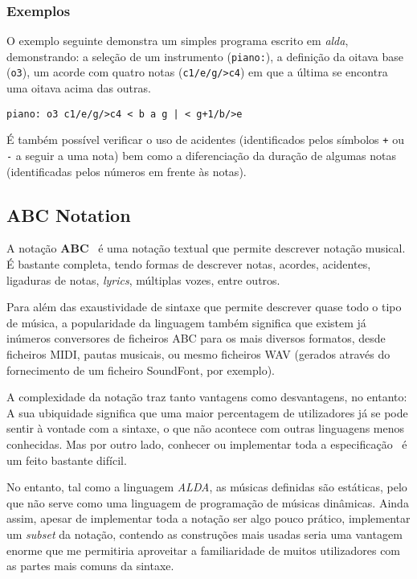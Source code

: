 \subsubsection{Exemplos}
O exemplo seguinte demonstra um simples programa escrito em \textit{alda}, demonstrando: a seleção de um instrumento (\texttt{piano:}), a definição da oitava base (\texttt{o3}), um acorde com quatro notas (\texttt{c1/e/g/>c4}) em que a última se encontra uma oitava acima das outras.
\begin{lstlisting}[caption={Exemplo da linguagem alda}]
piano: o3 c1/e/g/>c4 < b a g | < g+1/b/>e
\end{lstlisting}
 É também possível verificar o uso de acidentes (identificados pelos símbolos \texttt{+} ou \texttt{-} a seguir a uma nota) bem como a diferenciação da duração de algumas notas (identificadas pelos números em frente às notas).
\subsection{ABC Notation}
A notação \textbf{ABC}~\cite{AbcPlus, abc-notation} é uma notação textual que permite descrever notação musical. É bastante completa, tendo formas de descrever notas, acordes, acidentes, ligaduras de notas, \textit{lyrics}, múltiplas vozes, entre outros.

Para além das exaustividade de sintaxe que permite descrever quase todo o tipo de música, a popularidade da linguagem também significa que existem já inúmeros conversores de ficheiros ABC para os mais diversos formatos, desde ficheiros MIDI, pautas musicais, ou mesmo ficheiros WAV (gerados através do fornecimento de um ficheiro SoundFont, por exemplo).

A complexidade da notação traz tanto vantagens como desvantagens, no entanto: A sua ubiquidade significa que uma maior percentagem de utilizadores já se pode sentir à vontade com a sintaxe, o que não acontece com outras linguagens menos conhecidas. Mas por outro lado, conhecer ou implementar toda a especificação~\cite{abc-notation-standard} é um feito bastante difícil.

No entanto, tal como a linguagem \textit{ALDA}, as músicas definidas são estáticas, pelo que não serve como uma linguagem de programação de músicas dinâmicas. Ainda assim, apesar de implementar toda a notação ser algo pouco prático, implementar um \textit{subset} da notação, contendo as construções mais usadas seria uma vantagem enorme que me permitiria aproveitar a familiaridade de muitos utilizadores com as partes mais comuns da sintaxe.

